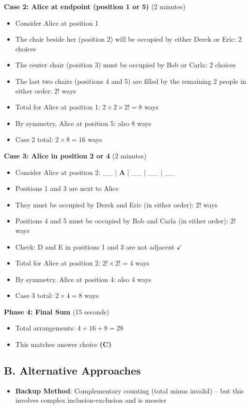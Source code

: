 \documentclass[]{article}
\begin{document}
\begin{solutionbox}
\textbf{Case 2: Alice at endpoint (position 1 or 5)} (2 minutes)
\begin{itemize}[leftmargin=*]
    \item Consider Alice at position 1
    \item The chair beside her (position 2) will be occupied by either Derek or Eric: 2 choices
    \item The center chair (position 3) must be occupied by Bob or Carla: 2 choices
    \item The last two chairs (positions 4 and 5) are filled by the remaining 2 people in either order: $2!$ ways
    \item Total for Alice at position 1: $2 \times 2 \times 2! = 8$ ways
    \item By symmetry, Alice at position 5: also 8 ways
    \item Case 2 total: $2 \times 8 = \boxed{16}$ ways
\end{itemize}

\textbf{Case 3: Alice in position 2 or 4} (2 minutes)
\begin{itemize}[leftmargin=*]
    \item Consider Alice at position 2: \_\_ | \textbf{A} | \_\_ | \_\_ | \_\_
    \item Positions 1 and 3 are next to Alice
    \item They must be occupied by Derek and Eric (in either order): $2!$ ways
    \item Positions 4 and 5 must be occupied by Bob and Carla (in either order): $2!$ ways
    \item Check: D and E in positions 1 and 3 are not adjacent $\checkmark$
    \item Total for Alice at position 2: $2! \times 2! = 4$ ways
    \item By symmetry, Alice at position 4: also 4 ways
    \item Case 3 total: $2 \times 4 = \boxed{8}$ ways
\end{itemize}

\textbf{Phase 4: Final Sum} (15 seconds)
\begin{itemize}[leftmargin=*]
    \item Total arrangements: $4 + 16 + 8 = \boxed{28}$
    \item This matches answer choice \textbf{(C)}
\end{itemize}

\subsection*{B. Alternative Approaches}
\begin{itemize}[leftmargin=*]
    \item \textbf{Backup Method}: Complementary counting (total minus invalid) -- but this involves complex inclusion-exclusion and is messier
    

\end{itemize}
\end{solutionbox}
\end{document}
